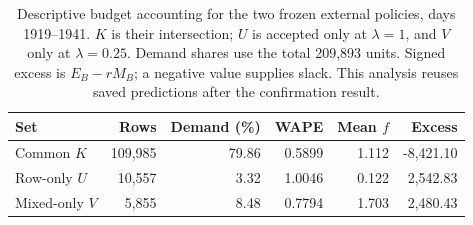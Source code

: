 \begin{table}[t]
\centering\small
\caption{Descriptive budget accounting for the two frozen external policies, days 1919--1941. $K$ is their intersection; $U$ is accepted only at $\lambda=1$, and $V$ only at $\lambda=0.25$. Demand shares use the total 209,893 units. Signed excess is $E_B-rM_B$; a negative value supplies slack. This analysis reuses saved predictions after the confirmation result.}
\label{tab:externalbudget}
\begin{tabular}{lrrrrr}
\toprule
Set & Rows & Demand (\%) & WAPE & Mean $f$ & Excess \\
\midrule
Common $K$ & 109,985 & 79.86 & 0.5899 & 1.112 & -8,421.10 \\
Row-only $U$ & 10,557 & 3.32 & 1.0046 & 0.122 & 2,542.83 \\
Mixed-only $V$ & 5,855 & 8.48 & 0.7794 & 1.703 & 2,480.43 \\
\bottomrule
\end{tabular}
\end{table}
